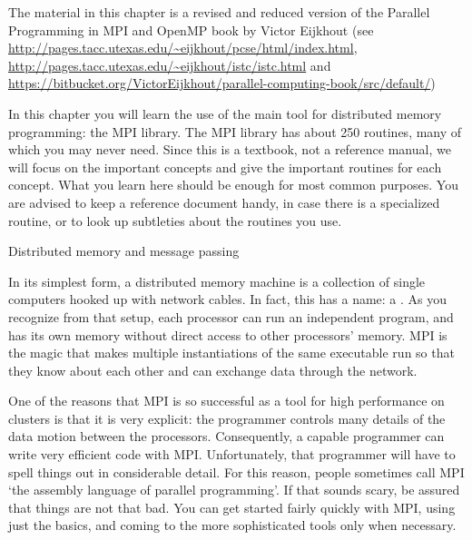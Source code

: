 
The material in this chapter is a revised and reduced version of the Parallel
Programming in MPI and OpenMP book by Victor Eijkhout (see
\url{http://pages.tacc.utexas.edu/~eijkhout/pcse/html/index.html},
\url{http://pages.tacc.utexas.edu/~eijkhout/istc/istc.html} and
\url{https://bitbucket.org/VictorEijkhout/parallel-computing-book/src/default/}) 
 
In this chapter you will learn the use of the main tool for 
distributed memory programming: the \acf{MPI} library.
The \ac{MPI} library has about 250 routines, many of which you may
never need. Since this is a textbook, not a reference manual, we will
focus on the important concepts and give the important routines for
each concept. What you learn here should be enough for most common
purposes. You are advised to keep a reference document handy, in
case there is a specialized routine, or to look up subtleties about
the routines you use.

 {Distributed memory and message passing}

In its simplest form, a distributed memory machine is a collection of
single computers hooked up with network cables. In fact, this has a name:
a . As you recognize from that setup, 
each processor can run an independent program, and has its own memory
without direct access to other processors' memory. MPI is the magic
that makes multiple instantiations of the same executable run
so that they know about each other and can exchange data through the 
network.

One of the reasons that MPI is so successful as a tool for high
performance on clusters is that it is very explicit: the programmer
controls many details of the data motion between the processors.
Consequently, a capable programmer can write very efficient code with MPI.
Unfortunately, that programmer will have to spell things out
in considerable detail. For this reason, people sometimes call MPI
`the assembly language of parallel programming'. If that sounds scary,
be assured that things are not that bad. You can get started 
fairly quickly with MPI, using just the basics,
and coming to the more sophisticated tools 
only when necessary.

